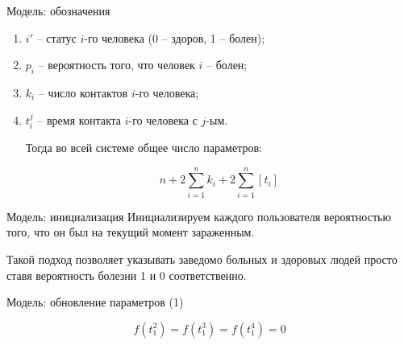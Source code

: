 \documentclass[hyperref={unicode}]{beamer}
\begin{document}

\begin{frame}{Модель: обозначения}
\begin{enumerate}
    \item $i'$ -- статус $i$-го человека (0 -- здоров, 1 -- болен);
    \item $p_i$ -- вероятность того, что человек $i$ -- болен;
    \item $k_i$ -- число контактов $i$-го человека;
    \item $t_i^j$ -- время контакта $i$-го человека с $j$-ым.
    
    \vspace{1cm}
    Тогда во всей системе общее число параметров:
    
    $$n + 2\sum\limits_{i=1}^nk_i + 2\sum\limits_{i=1}^n[t_i]$$
\end{enumerate} 
\end{frame}
\begin{frame}{Модель: инициализация}
Инициализируем каждого пользователя вероятностью того, что он был на текущий момент зараженным.

Такой подход позволяет указывать заведомо больных и здоровых людей просто ставя вероятность болезни 1 и 0 соответственно.
\end{frame}
\begin{frame}{Модель: обновление параметров (1)}

$$f(t^2_1)=f(t^3_1)=f(t^4_1)=0$$


\end{frame}
\end{document}
